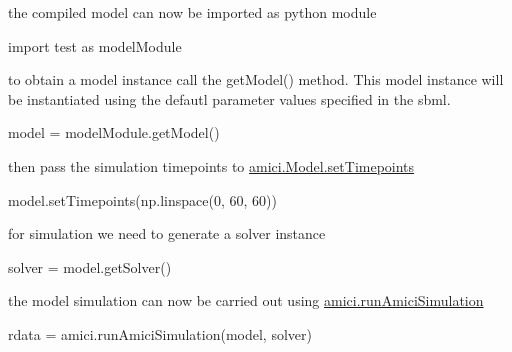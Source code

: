 the compiled model can now be imported as python module \begin{DoxyVerb}import test as modelModule
\end{DoxyVerb}


to obtain a model instance call the {\ttfamily get\+Model()} method. This model instance will be instantiated using the defautl parameter values specified in the sbml. \begin{DoxyVerb}model = modelModule.getModel()
\end{DoxyVerb}


then pass the simulation timepoints to {\ttfamily \mbox{\hyperlink{classamici_1_1_model_a50f9642f9bcb883dbd3925c85abc4c24}{amici.\+Model.\+set\+Timepoints}}} \begin{DoxyVerb}model.setTimepoints(np.linspace(0, 60, 60)) 
\end{DoxyVerb}


for simulation we need to generate a solver instance \begin{DoxyVerb}solver = model.getSolver()
\end{DoxyVerb}


the model simulation can now be carried out using {\ttfamily \mbox{\hyperlink{namespaceamici_a025192a6f53e19eae958cd3b14786f80}{amici.\+run\+Amici\+Simulation}}} \begin{DoxyVerb}rdata = amici.runAmiciSimulation(model, solver)
\end{DoxyVerb}
 